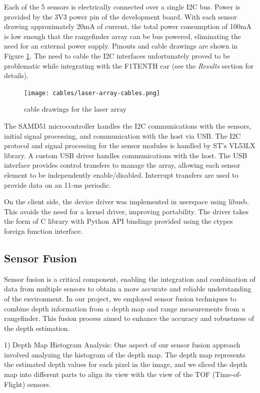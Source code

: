 \documentclass[conference]{IEEEtran}
\begin{document}
Each of the 5 sensors is electrically connected over a single I2C bus. Power is
provided by the 3V3 power pin of the development board. With each sensor
drawing approximately 20mA of current, the total power consumption of 100mA is
low enough that the rangefinder array can be bus powered, eliminating the need
for an external power supply. Pinouts and cable drawings are shown in Figure
\ref{fig:cable-drawings}. The need to cable the I2C interfaces unfortunately
proved to be problematic while integrating with the F1TENTH car (see the
\textit{Results} section for details).

\begin{figure}
\centering
\texttt{[image: cables/laser-array-cables.png]}
\caption{cable drawings for the laser array}
\label{fig:cable-drawings}
\end{figure}

The SAMD51 microcontroller handles the I2C communications with the sensors,
initial signal processing, and communication with the host via USB. The I2C
protocol and signal processing for the sensor modules is handled by ST's VL53LX
library. A custom USB driver handles communications with the host. The USB
interface provides control transfers to manage the array, allowing each sensor
element to be independently enable/disabled. Interrupt transfers are used to
provide data on an 11-ms periodic.

\FloatBarrier

On the client side, the device driver was implemented in userspace using
libusb. This avoids the need for a kernel driver, improving portability. The
driver takes the form of C library with Python API bindings provided using
the ctypes foreign function interface.

\subsection{Sensor Fusion}
Sensor fusion is a critical component, enabling the integration and combination of data from multiple sensors to obtain a more accurate and reliable understanding of the environment. In our project, we employed sensor fusion techniques to combine depth information from a depth map and range measurements from a rangefinder. This fusion process aimed to enhance the accuracy and robustness of the depth estimation.

1) Depth Map Histogram Analysis:
One aspect of our sensor fusion approach involved analyzing the histogram of the depth map. The depth map represents the estimated depth values for each pixel in the image, and we sliced the depth map into different parts to align its view with the view of the TOF (Time-of-Flight) sensors. 
\end{document}
